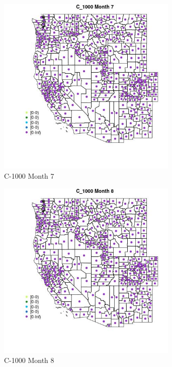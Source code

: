\begin{figure} 
\centering  
\includegraphics[width=0.77\textwidth]{Code_Outputs/df_report_ML_predictors_CountyCentroid_Locations_Dates_2008-01-01to2018-12-31_MapObsMo7C_1000.jpg} 
\caption{\label{fig:df_report_ML_predictors_CountyCentroid_Locations_Dates_2008-01-01to2018-12-31MapObsMo7C_1000}C-1000 Month 7} 
\end{figure} 
 

\begin{figure} 
\centering  
\includegraphics[width=0.77\textwidth]{Code_Outputs/df_report_ML_predictors_CountyCentroid_Locations_Dates_2008-01-01to2018-12-31_MapObsMo8C_1000.jpg} 
\caption{\label{fig:df_report_ML_predictors_CountyCentroid_Locations_Dates_2008-01-01to2018-12-31MapObsMo8C_1000}C-1000 Month 8} 
\end{figure} 
 

